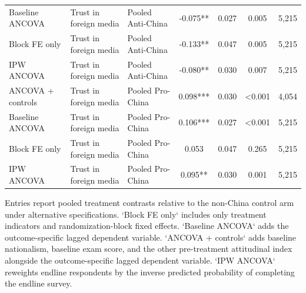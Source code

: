 \begin{table}[H]
\begin{threeparttable}
\begin{tabular}{lllcccc}
Baseline ANCOVA & Trust in foreign media & Pooled Anti-China & -0.075** & 0.027 & 0.005 & 5,215 \\
Block FE only & Trust in foreign media & Pooled Anti-China & -0.133** & 0.047 & 0.005 & 5,215 \\
IPW ANCOVA & Trust in foreign media & Pooled Anti-China & -0.080** & 0.030 & 0.007 & 5,215 \\
ANCOVA + controls & Trust in foreign media & Pooled Pro-China & 0.098*** & 0.030 & <0.001 & 4,054 \\
Baseline ANCOVA & Trust in foreign media & Pooled Pro-China & 0.106*** & 0.027 & <0.001 & 5,215 \\
Block FE only & Trust in foreign media & Pooled Pro-China & 0.053 & 0.047 & 0.265 & 5,215 \\
IPW ANCOVA & Trust in foreign media & Pooled Pro-China & 0.095** & 0.030 & 0.001 & 5,215 \\
\bottomrule
\end{tabular}
\begin{tablenotes}[flushleft]
\footnotesize
\item Entries report pooled treatment contrasts relative to the non-China control arm under alternative specifications. `Block FE only` includes only treatment indicators and randomization-block fixed effects. `Baseline ANCOVA` adds the outcome-specific lagged dependent variable. `ANCOVA + controls` adds baseline nationalism, baseline exam score, and the other pre-treatment attitudinal index alongside the outcome-specific lagged dependent variable. `IPW ANCOVA` reweights endline respondents by the inverse predicted probability of completing the endline survey.
\end{tablenotes}
\end{threeparttable}
\end{table}
